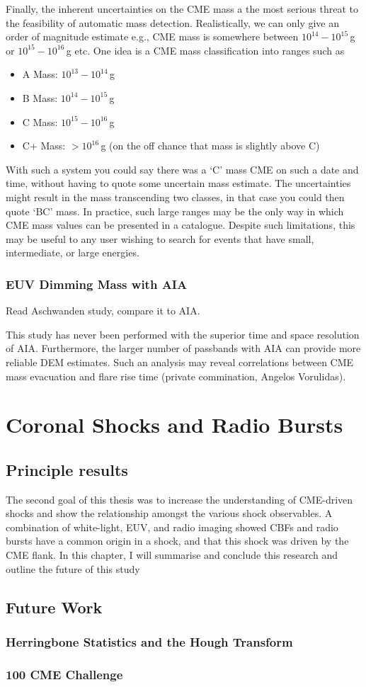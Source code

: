 Finally, the inherent uncertainties on the CME mass a the most serious threat to the feasibility of automatic mass detection. Realistically, we can only give an order of magnitude estimate e.g., CME mass is somewhere between $10^{14}-10^{15}$\,g or $10^{15}-10^{16}$\,g etc. One idea is a CME mass classification into ranges such as
\begin{itemize}
\item A Mass: $10^{13}-10^{14}$\,g
\item B Mass: $10^{14}-10^{15}$\,g
\item C Mass: $10^{15}-10^{16}$\,g
\item C+ Mass: $>10^{16}$\,g (on the off chance that mass is slightly above C)
\end{itemize}
With such a system you could say there was a \textquoteleft C' mass CME on such a date and time, without having to quote some uncertain mass estimate. The uncertainties might result in the mass transcending two classes, in that case you could then quote \textquoteleft BC' mass. In practice, such large ranges may be the only way in which CME mass values can be presented in a catalogue. Despite such limitations, this may be useful to any user wishing to search for events that have small, intermediate, or large energies.

\subsubsection{EUV Dimming Mass with AIA}

Read Aschwanden study, compare it to AIA.

This study has never been performed with the superior time and space resolution of AIA. Furthermore, the larger number of passbands with AIA can provide more reliable DEM estimates. Such an analysis may reveal correlations between CME mass evacuation and flare rise time (private commination, Angelos Vorulidas).


\section{Coronal Shocks and Radio Bursts}

\subsection{Principle results}
The second goal of this thesis was to increase the understanding of CME-driven shocks and show the relationship amongst the various shock observables. A combination of white-light, EUV, and radio imaging showed CBFs and radio bursts have a common origin in a shock, and that this shock was driven by the CME flank. In this chapter, I will summarise and conclude this research and outline the future of this study

\subsection{Future Work}

\subsubsection{Herringbone Statistics and the Hough Transform}

\subsubsection{100 CME Challenge}


